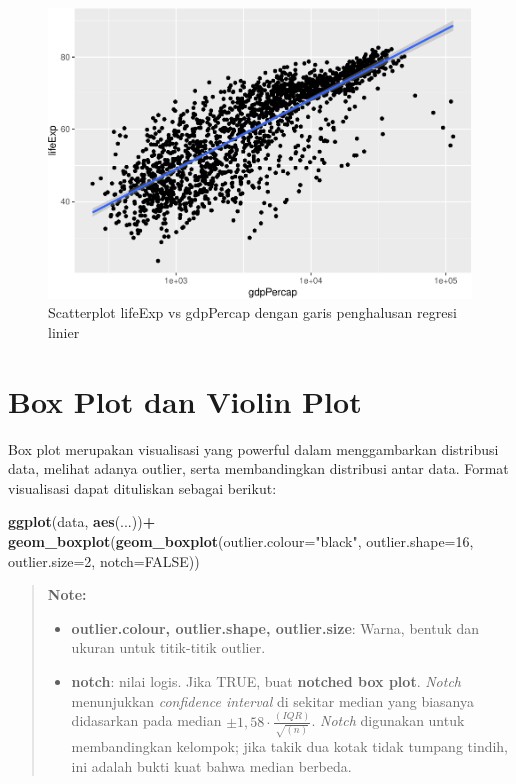 \documentclass[]{book}
\newenvironment{Shaded}{\begin{snugshade}}{\end{snugshade}}
\newcommand{\KeywordTok}[1]{\textcolor[rgb]{0.13,0.29,0.53}{\textbf{#1}}}
\newcommand{\DataTypeTok}[1]{\textcolor[rgb]{0.13,0.29,0.53}{#1}}
\newcommand{\DecValTok}[1]{\textcolor[rgb]{0.00,0.00,0.81}{#1}}
\newcommand{\StringTok}[1]{\textcolor[rgb]{0.31,0.60,0.02}{#1}}
\newcommand{\OtherTok}[1]{\textcolor[rgb]{0.56,0.35,0.01}{#1}}
\newcommand{\OperatorTok}[1]{\textcolor[rgb]{0.81,0.36,0.00}{\textbf{#1}}}
\newcommand{\NormalTok}[1]{#1}
\providecommand{\tightlist}{%
  \setlength{\itemsep}{0pt}\setlength{\parskip}{0pt}}
\begin{document}
\begin{figure}

{\centering \includegraphics[width=0.7\linewidth]{EnvStat_files/figure-latex/ggscatter5-1} 

}

\caption{Scatterplot lifeExp vs gdpPercap dengan garis penghalusan regresi linier}\label{fig:ggscatter5}
\end{figure}

\section{Box Plot dan Violin Plot}\label{box-plot-dan-violin-plot}

Box plot merupakan visualisasi yang powerful dalam menggambarkan
distribusi data, melihat adanya outlier, serta membandingkan distribusi
antar data. Format visualisasi dapat dituliskan sebagai berikut:

\begin{Shaded}
\begin{Highlighting}[]
\KeywordTok{ggplot}\NormalTok{(data, }\KeywordTok{aes}\NormalTok{(...))}\OperatorTok{+}
\StringTok{  }\KeywordTok{geom_boxplot}\NormalTok{(}\KeywordTok{geom_boxplot}\NormalTok{(}\DataTypeTok{outlier.colour=}\StringTok{"black"}\NormalTok{, }
                            \DataTypeTok{outlier.shape=}\DecValTok{16}\NormalTok{,}
                            \DataTypeTok{outlier.size=}\DecValTok{2}\NormalTok{, }
                            \DataTypeTok{notch=}\OtherTok{FALSE}\NormalTok{))}
\end{Highlighting}
\end{Shaded}

\begin{quote}
\textbf{Note: }

\begin{itemize}
\tightlist
\item
  \textbf{outlier.colour, outlier.shape, outlier.size}: Warna, bentuk
  dan ukuran untuk titik-titik outlier.
\item
  \textbf{notch}: nilai logis. Jika TRUE, buat \textbf{notched box
  plot}. \emph{Notch} menunjukkan \emph{confidence interval} di sekitar
  median yang biasanya didasarkan pada median
  \(\pm1,58\cdot\frac{\left(IQR\right)}{\sqrt{\left(n\right)}}\).
  \emph{Notch} digunakan untuk membandingkan kelompok; jika takik dua
  kotak tidak tumpang tindih, ini adalah bukti kuat bahwa median
  berbeda.
\end{itemize}
\end{quote}
\end{document}
